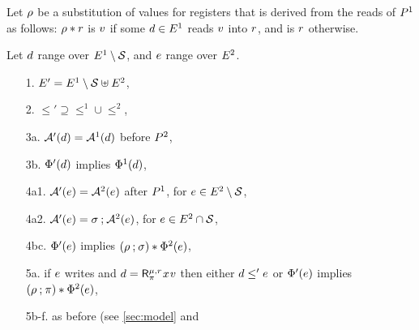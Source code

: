 \begin{definition}
Let $\SUBDRS{\aPS}$ be a substitution of values for registers that is derived
from the reads of $\aPS^1$ as follows: $\SUBDRS{\aPS}\SUBAPP\aReg$ is $\aVal$
if some $\bEv\in\Event^1$ reads $\aVal$ into $\aReg$, and is $\aReg$ otherwise.

Let $\bEv$ range over $\Event^1\setminus\Sub$, and $\aEv$ range over $\Event^2$.  


\begin{enumerate}
\item[1.] $\Event' = \Event^1\setminus\Sub \uplus \Event^2$,
\item[2.] ${\le'}\supseteq{\le^1}\cup{\le^2}$, 
\item[3a.] $\labelingAct'(\bEv) = \labelingAct^1(\bEv)$ before $\aPS^2$,
\item[3b.] $\labelingForm'(\bEv)$ implies $\labelingForm^1(\bEv)$,
\item[4a1.] $\labelingAct'(\aEv) = \labelingAct^2(\aEv)$  after $\aPS^1$,  for $\aEv\in\Event^2\setminus\Sub$,
\item[4a2.] $\labelingAct'(\aEv) = \aSubC\SUBSEQ\labelingAct^2(\aEv)$,  for $\aEv\in\Event^2\cap\Sub$, 
\item[4bc.] $\labelingForm'(\aEv)$ implies
  $(\SUBDRS{\aPS^1} \SUBSEQ \aSubC)\SUBAPP\labelingForm^2(\aEv)$, 
\item[5a.] if $\aEv$ writes and
  $\bEv=\DRreg[\amode]{\aReg}{\bSub}{\aLoc}{\aVal}$
  then either $\bEv\le'\aEv$ or
  $\labelingForm'(\aEv)$ implies  
  $(\SUBDRS{\aPS^1}\SUBSEQ \bSub)\SUBAPP\labelingForm^2(\aEv)$,
\item[5b-f.] as before (see \textsection\ref{sec:model} and

\end{enumerate}
\end{definition}
